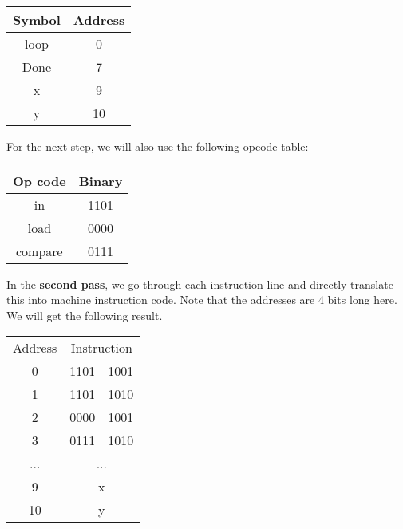 \documentclass[]{article}
\begin{document}
\begin{center}
	\begin{tabular}{|c|c|}\hline
		Symbol & Address \\\hline
		loop & 0 \\\hline
		Done & 7 \\\hline
		x & 9 \\\hline
		y & 10 \\\hline
	\end{tabular}
	\bigbreak
\end{center}

For the next step, we will also use the following opcode table:

\begin{center}
	\begin{tabular}{|c|c|}\hline
		Op code & Binary \\\hline
		in & 1101 \\\hline
		load & 0000 \\\hline
		compare & 0111 \\\hline
	\end{tabular}
	\bigbreak
\end{center}

In the \textbf{second pass},  we go through each instruction line and directly translate this into machine instruction code. Note that the addresses are 4 bits long here. We will get the following result.

\begin{center}
	\begin{tabular}{c|c|c|}
		\multicolumn{1}{c}{Address} & \multicolumn{2}{c}{Instruction}\\\cline{2-3}
		0 & 1101 & 1001 \\\cline{2-3}
		1 & 1101 & 1010 \\\cline{2-3}
		2 & 0000 & 1001 \\\cline{2-3}
		3 & 0111 & 1010 \\\cline{2-3}
		... & \multicolumn{2}{|c|}{...} \\\cline{2-3}
		9 & \multicolumn{2}{|c|}{x} \\\cline{2-3}
		10 & \multicolumn{2}{|c|}{y} \\\cline{2-3}
	\end{tabular}
	\bigbreak
\end{center}
\end{document}
